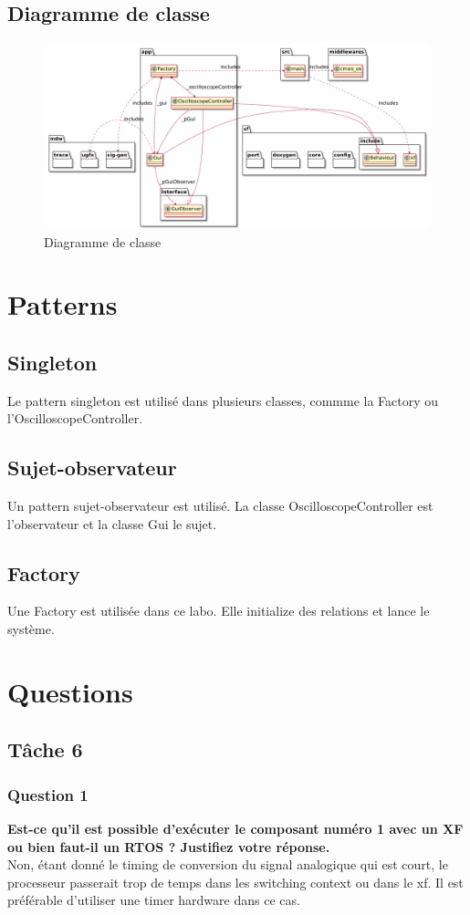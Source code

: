 \documentclass[12pt]{article}
\begin{document}
	\subsection{Diagramme de classe}
	\begin{figure}[H]
	\begin{center}
		\includegraphics[angle=270,scale=0.48]{Ressources/class.pdf}
		\caption{\label{class} Diagramme de classe}
	\end{center}
\end{figure}
	\section{Patterns}
	\subsection{Singleton}
	Le pattern singleton est utilisé dans plusieurs classes, commme la Factory ou l'OscilloscopeController.
	\subsection{Sujet-observateur}
	Un pattern sujet-observateur est utilisé. La classe OscilloscopeController est l'observateur et la classe Gui le sujet.
	\subsection{Factory}
	Une Factory est utilisée dans ce labo. Elle initialize des relations et lance le système.
	\section{Questions}
	\subsection{Tâche 6}
	\subsubsection{Question 1}
	\textbf{Est-ce qu'il est possible d'exécuter le composant numéro 1 avec un XF ou bien faut-il un RTOS ? Justifiez votre réponse.}\\
	Non, étant donné le timing de conversion du signal analogique qui est court, le processeur passerait trop de temps dans les switching context ou dans le xf. Il est préférable d'utiliser une timer hardware dans ce cas.
\end{document}
